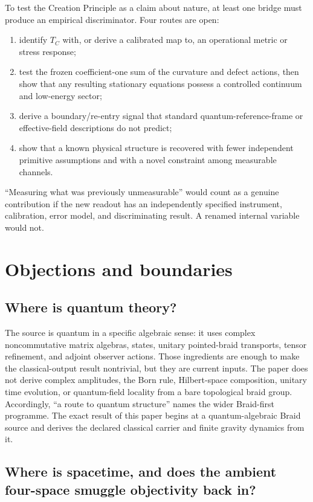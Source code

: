\documentclass[11pt]{article}
\theoremstyle{definition}
\theoremstyle{remark}
\begin{document}
To test the Creation Principle as a claim about nature, at least one bridge must produce an empirical discriminator. Four routes are open:
\begin{enumerate}
\item identify $T_C$ with, or derive a calibrated map to, an operational metric or stress response;
\item test the frozen coefficient-one sum of the curvature and defect actions, then show that any resulting stationary equations possess a controlled continuum and low-energy sector;
\item derive a boundary/re-entry signal that standard quantum-reference-frame or effective-field descriptions do not predict;
\item show that a known physical structure is recovered with fewer independent primitive assumptions and with a novel constraint among measurable channels.
\end{enumerate}

``Measuring what was previously unmeasurable'' would count as a genuine contribution if the new readout has an independently specified instrument, calibration, error model, and discriminating result. A renamed internal variable would not.

\section{Objections and boundaries}

\subsection{Where is quantum theory?}

The source is quantum in a specific algebraic sense: it uses complex noncommutative matrix algebras, states, unitary pointed-braid transports, tensor refinement, and adjoint observer actions. Those ingredients are enough to make the classical-output result nontrivial, but they are current inputs. The paper does not derive complex amplitudes, the Born rule, Hilbert-space composition, unitary time evolution, or quantum-field locality from a bare topological braid group. Accordingly, ``a route to quantum structure'' names the wider Braid-first programme. The exact result of this paper begins at a quantum-algebraic Braid source and derives the declared classical carrier and finite gravity dynamics from it.

\subsection{Where is spacetime, and does the ambient four-space smuggle objectivity back in?}
\end{document}
